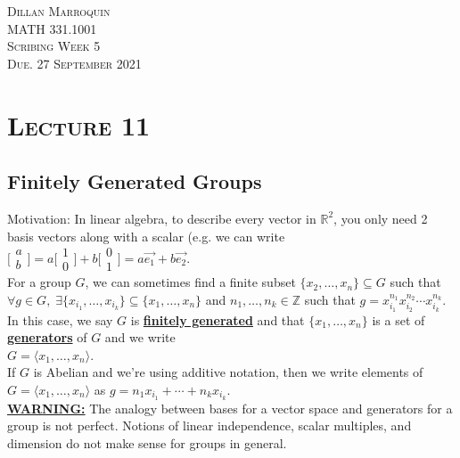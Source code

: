 \documentclass{article}
\newcommand{\Z}{\mathbb{Z}}
\newcommand{\R}{\mathbb{R}}
\newcommand{\define}[1]{\textbf{\underline{#1}}}
\theoremstyle{definition}
\theoremstyle{remark}
\begin{document}
    \begin{center}
        \textsc{Dillan Marroquin\\MATH 331.1001\\Scribing Week 5\\Due. 27 September 2021\\}
    \end{center}
        
    \noindent\section*{\textbf{\textsc{Lecture 11}}}{
        \subsection*{Finitely Generated Groups}{
            Motivation: In linear algebra, to describe every vector in $\R^2$, you only need 2 basis vectors along with a scalar (e.g. we can write $\big[\begin{smallmatrix}a\\b\end{smallmatrix}\big]= a\big[\begin{smallmatrix}1\\0\end{smallmatrix}\big]+b\big[\begin{smallmatrix}0\\1\end{smallmatrix}\big]=a\Vec{e_1}+b\Vec{e_2}$.\\
            
            \noindent For a group $G$, we can sometimes find a finite subset $\{x_2,\ldots,x_n\}\subseteq G$ such that $\forall g \in G, \; \exists \{x_{i_1},\ldots, x_{i_k}\} \subseteq \{x_1,\ldots,x_n\}$ and $n_1,\ldots,n_k \in \Z$ such that $g=x_{i_1}^{n_1}x_{i_2}^{n_2}\cdots x_{i_k}^{n_k}$.\\
            In this case, we say $G$ is \define{finitely generated} and that $\{x_1,\ldots,x_n\}$ is a set of \define{generators} of $G$ and we write\\$G=\langle x_1,\ldots,x_n\rangle$.\\
            
            \noindent If $G$ is Abelian and we're using additive notation, then we write elements of $G=\langle x_1,\ldots,x_n\rangle$ as $g=n_1x_{i_1}+\cdots+n_kx_{i_k}$.\\
            
            \noindent\define{WARNING:} The analogy between bases for a vector space and generators for a group is not perfect. Notions of linear independence, scalar multiples, and dimension do not make sense for groups in general.
        }
}
\end{document}
